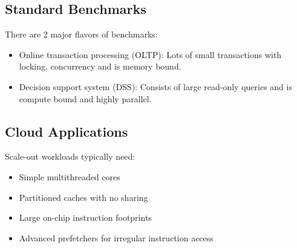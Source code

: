 \documentclass{article}
\begin{document}
\begin{multicols*}{2}
\subsection{Standard Benchmarks}
There are 2 major flavors of benchmarks:
\begin{itemize}
    \item Online transaction processing (OLTP): Lots of small transactions with locking, concurrency and is memory bound.
    \item Decision support system (DSS): Consists of large read-only queries and is compute bound and highly parallel.
\end{itemize}

\subsection{Cloud Applications}
Scale-out workloads typically need:
\begin{itemize}
    \item Simple multithreaded cores
    \item Partitioned caches with no sharing
    \item Large on-chip instruction footprints
    \item Advanced prefetchers for irregular instruction access
\end{itemize}

\end{multicols*}
\end{document}
